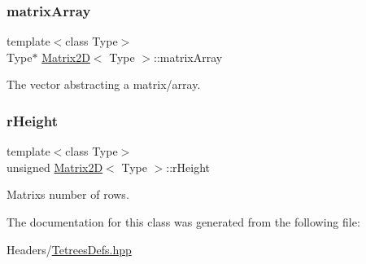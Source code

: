 \subsubsection{\texorpdfstring{matrix\+Array}{matrixArray}}
{\footnotesize\ttfamily template$<$class Type$>$ \\
Type$\ast$ \hyperlink{classMatrix2D}{Matrix2D}$<$ Type $>$\+::matrix\+Array\hspace{0.3cm}{\ttfamily [private]}}

The vector abstracting a matrix/array. \mbox{\label{classMatrix2D_afdcd47964719a1c4e006fbdd313d2f17}} 
\subsubsection{\texorpdfstring{r\+Height}{rHeight}}
{\footnotesize\ttfamily template$<$class Type$>$ \\
unsigned \hyperlink{classMatrix2D}{Matrix2D}$<$ Type $>$\+::r\+Height\hspace{0.3cm}{\ttfamily [private]}}

Matrix\textquotesingle{}s number of rows. 

The documentation for this class was generated from the following file\+:\begin{DoxyCompactItemize}
\item 
Headers/\hyperlink{TetreesDefs_8hpp}{Tetrees\+Defs.\+hpp}\end{DoxyCompactItemize}
